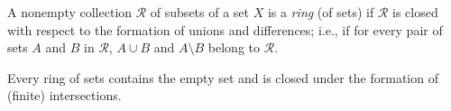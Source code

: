 A nonempty collection $\mathcal{R}$ of subsets of a set $X$ is a \textit{ring} (of sets) if $\mathcal{R}$ is closed with respect to the formation of unions and differences; i.e., if for every pair of sets $A$ and $B$ in $\mathcal{R}$, $A \cup B$ and $A \setminus B$ belong to $\mathcal{R}$.

Every ring of sets contains the empty set and is closed under the formation of (finite) intersections.

